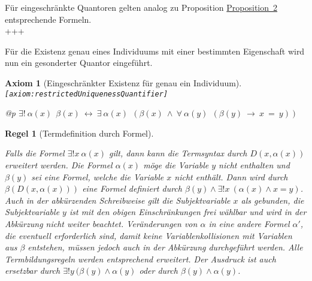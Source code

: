 \documentclass[a4paper,german,10pt,twoside]{book}
\newtheorem{ax}{Axiom}
\newtheorem{rul}{Regel}
\theoremstyle{definition}
\theoremstyle{remark}
\begin{document}
F{\"u}r eingeschr{\"a}nkte Quantoren gelten analog zu Proposition \hyperlink{theorem:predicateCalculus}{Proposition~2} entsprechende Formeln.
\\
+++


\par
F{\"u}r die Existenz genau eines Individuums mit einer bestimmten Eigenschaft wird nun ein gesonderter Quantor eingef{\"u}hrt.

\begin{ax}[Eingeschr{\"a}nkter Existenz f{\"u}r genau ein Individuum]
\label{axiom:restrictedUniquenessQuantifier} \hypertarget{axiom:restrictedUniquenessQuantifier}{}
{\tt \tiny [\verb]axiom:restrictedUniquenessQuantifier]]}
\mbox{}
\begin{longtable}{{@{\extracolsep{\fill}}p{\linewidth}}}
\centering $\exists! \ \alpha(x)\ \ \beta(x)\ \leftrightarrow\ \exists \ \alpha(x)\ \ (\beta(x)\ \land\ \forall \ \alpha(y)\ \ (\beta(y)\ \rightarrow\ x \ = \ y))$
\end{longtable}

\end{ax}


\begin{rul}[Termdefinition durch Formel]\hypertarget{rule:termdef}{}
Falls die Formel $\exists! x \ \alpha(x)$ gilt, dann kann die Termsyntax durch $D(x, \alpha(x))$ erweitert werden. Die Formel $\alpha(x)$ m{\"o}ge die Variable $y$ nicht enthalten und $\beta(y)$ sei eine Formel, welche die Variable $x$ nicht enth{\"a}lt. Dann wird durch $\beta(D(x, \alpha(x)))$ eine
Formel definiert durch $\beta(y) \land \exists! x \ (\alpha(x) \land x = y)$. Auch in der abk{\"u}rzenden Schreibweise gilt die Subjektvariable $x$ als gebunden, die Subjektvariable $y$ ist mit den obigen Einschr{\"a}nkungen frei w{\"a}hlbar und wird in der Abk{\"u}rzung nicht weiter beachtet. Ver{\"a}nderungen von $\alpha$ in eine andere Formel $\alpha'$, die eventuell erforderlich sind, damit keine Variablenkollisionen mit Variablen aus $\beta$ entstehen, m{\"u}ssen jedoch auch in der Abk{\"u}rzung durchgef{\"u}hrt werden. Alle Termbildungsregeln werden entsprechend erweitert. Der Ausdruck ist auch ersetzbar durch $\exists! y \ (\beta(y) \land \alpha(y)$ oder durch $\beta(y) \land \alpha(y)$.
\end{rul}




\backmatter
\end{document}
